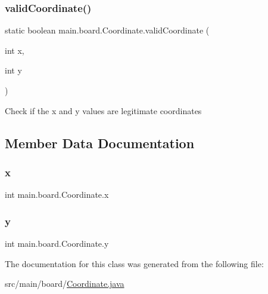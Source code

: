 \subsubsection{\texorpdfstring{valid\+Coordinate()}{validCoordinate()}}
{\footnotesize\ttfamily static boolean main.\+board.\+Coordinate.\+valid\+Coordinate (\begin{DoxyParamCaption}\item[{int}]{x,  }\item[{int}]{y }\end{DoxyParamCaption})\hspace{0.3cm}{\ttfamily [static]}}

Check if the x and y values are legitimate coordinates 

\subsection{Member Data Documentation}
\hypertarget{classmain_1_1board_1_1_coordinate_ac701cbd77073d0d4a9150c818e48786c}{}\label{classmain_1_1board_1_1_coordinate_ac701cbd77073d0d4a9150c818e48786c} 
\subsubsection{\texorpdfstring{x}{x}}
{\footnotesize\ttfamily int main.\+board.\+Coordinate.\+x}

\hypertarget{classmain_1_1board_1_1_coordinate_a27d26b13fe0a54b6800a9a3e130b0445}{}\label{classmain_1_1board_1_1_coordinate_a27d26b13fe0a54b6800a9a3e130b0445} 
\subsubsection{\texorpdfstring{y}{y}}
{\footnotesize\ttfamily int main.\+board.\+Coordinate.\+y}



The documentation for this class was generated from the following file\+:\begin{DoxyCompactItemize}
\item 
src/main/board/\hyperlink{_coordinate_8java}{Coordinate.\+java}\end{DoxyCompactItemize}
